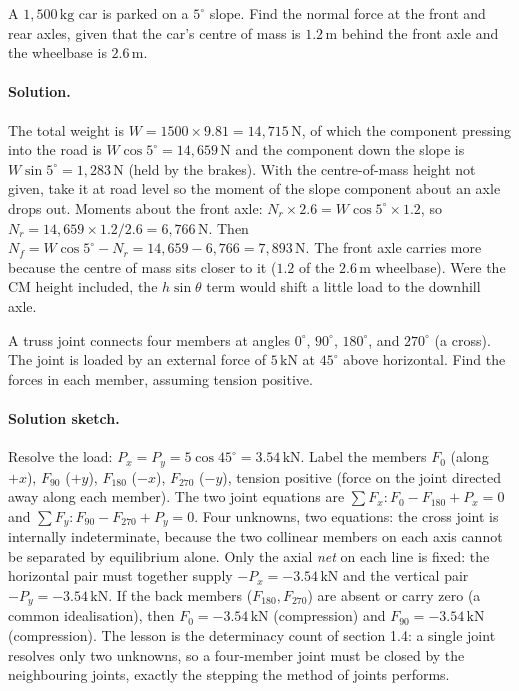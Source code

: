 \begin{exercise}
A $1{,}500\,\si{\kilogram}$ car is parked on a $5^{\circ}$ slope.
Find the normal force at the front and rear axles, given that the
car's centre of mass is $1.2\,\si{\meter}$ behind the front axle and
the wheelbase is $2.6\,\si{\meter}$.
\paragraph{Solution.} The total weight is $W = 1500 \times 9.81 =
14{,}715\,\text{N}$, of which the component pressing into the road is
$W\cos 5^{\circ} = 14{,}659\,\text{N}$ and the component down the slope
is $W\sin 5^{\circ} = 1{,}283\,\text{N}$ (held by the brakes). With the
centre-of-mass height not given, take it at road level so the moment of
the slope component about an axle drops out. Moments about the front
axle: $N_r \times 2.6 = W\cos 5^{\circ} \times 1.2$, so $N_r =
14{,}659 \times 1.2 / 2.6 = 6{,}766\,\text{N}$. Then $N_f = W\cos
5^{\circ} - N_r = 14{,}659 - 6{,}766 = 7{,}893\,\text{N}$. The front
axle carries more because the centre of mass sits closer to it ($1.2$ of
the $2.6\,\si{\meter}$ wheelbase). Were the CM height included, the
$h\sin\theta$ term would shift a little load to the downhill axle.
\end{exercise}

\begin{exercise}
A truss joint connects four members at angles $0^{\circ}$,
$90^{\circ}$, $180^{\circ}$, and $270^{\circ}$ (a cross). The joint
is loaded by an external force of $5\,\text{kN}$ at $45^{\circ}$
above horizontal. Find the forces in each member, assuming tension
positive.
\paragraph{Solution sketch.} Resolve the load: $P_x = P_y = 5\cos
45^{\circ} = 3.54\,\text{kN}$. Label the members $F_0$ (along $+x$),
$F_{90}$ ($+y$), $F_{180}$ ($-x$), $F_{270}$ ($-y$), tension positive
(force on the joint directed away along each member). The two joint
equations are $\sum F_x: F_0 - F_{180} + P_x = 0$ and $\sum F_y:
F_{90} - F_{270} + P_y = 0$. Four unknowns, two equations: the cross
joint is internally indeterminate, because the two collinear members on
each axis cannot be separated by equilibrium alone. Only the axial
\emph{net} on each line is fixed: the horizontal pair must together
supply $-P_x = -3.54\,\text{kN}$ and the vertical pair $-P_y =
-3.54\,\text{kN}$. If the back members ($F_{180}, F_{270}$) are absent
or carry zero (a common idealisation), then $F_0 = -3.54\,\text{kN}$
(compression) and $F_{90} = -3.54\,\text{kN}$ (compression). The lesson
is the determinacy count of section 1.4: a single joint resolves only
two unknowns, so a four-member joint must be closed by the neighbouring
joints, exactly the stepping the method of joints performs.
\end{exercise}

